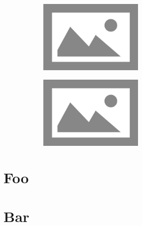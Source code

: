 \documentclass{thesis}
\begin{document}
\begin{figure}
  \caption{The most interesting image}
  \centering
  \begin{subfigure}{0.49\linewidth}
    \includegraphics[height=100pt,keepaspectratio=true]{./images/placeholder.png}
  \end{subfigure}
  \begin{subfigure}{0.49\linewidth}
    \includegraphics[height=100pt,keepaspectratio=true]{./images/placeholder.png}
  \end{subfigure}
\end{figure}

\blindmathpaper

\printglossaries
\printbibliography[heading=bibintoc]

\begin{appendices}
\chapter{Foo}
\blindtext
\chapter{Bar}
\blindtext
\end{appendices}
\end{document}
